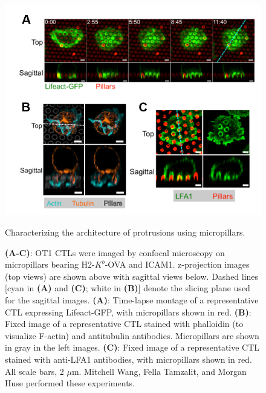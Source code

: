 \begin{figure}[htbp]
	\centering
	\includegraphics[width=\textwidth]{../figures/chapter2/fig1pillars.png}
	\caption{Characterizing the architecture of protrusions using micropillars.}
	\caption*{\textbf{(A-C)}: OT1 CTLs were imaged by confocal microscopy on micropillars bearing H2-$K^{b}$-OVA and ICAM1. z-projection images (top views) are shown above with sagittal views below. Dashed lines [cyan in \textbf{(A)} and \textbf{(C)}; white in \textbf{(B)}] denote the slicing plane used for the sagittal images. \textbf{(A)}: Time-lapse montage of a representative CTL expressing Lifeact-GFP, with micropillars shown in red. \textbf{(B)}: Fixed image of a representative CTL stained with phalloidin (to visualize F-actin) and antitubulin antibodies. Micropillars are shown in gray in the left images. \textbf{(C)}: Fixed image of a representative CTL stained with anti-LFA1 antibodies, with micropillars shown in red. All scale bars, 2 $\mu$m. Mitchell Wang, Fella Tamzalit, and Morgan Huse performed these experiments.}
	\label{fig:fig1pillars}
\end{figure}

